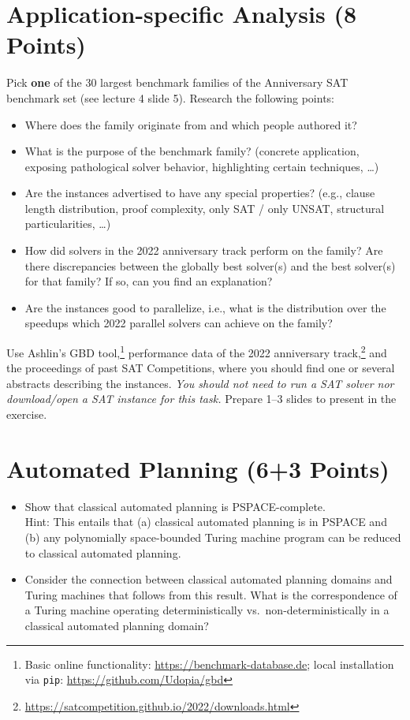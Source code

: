 \documentclass[a4paper]{article}
\begin{document}









\section{Application-specific Analysis (8 Points)}

Pick \textbf{one} of the 30 largest benchmark families of the Anniversary SAT benchmark set (see lecture 4 slide 5).
Research the following points:
\begin{itemize}
	\item Where does the family originate from and which people authored it?
	\item What is the purpose of the benchmark family? (concrete application, exposing pathological solver behavior, highlighting certain techniques, \ldots)
	\item Are the instances advertised to have any special properties? (e.g., clause length distribution, proof complexity, only SAT / only UNSAT, structural particularities, \ldots)
	\item How did solvers in the 2022 anniversary track perform on the family? Are there discrepancies between the globally best solver(s) and the best solver(s) for that family? If so, can you find an explanation?
	\item Are the instances good to parallelize, i.e., what is the distribution over the speedups which 2022 parallel solvers can achieve on the family?
\end{itemize}
Use Ashlin's GBD tool,\footnote{
	Basic online functionality: \url{https://benchmark-database.de}; local installation via \texttt{pip}: \url{https://github.com/Udopia/gbd}
} performance data of the 2022 anniversary track,\footnote{
	\url{https://satcompetition.github.io/2022/downloads.html}
} and the proceedings of past SAT Competitions, where you should find one or several abstracts describing the instances.
\textit{You should not need to run a SAT solver nor download/open a SAT instance for this task.}
Prepare 1--3 slides to present in the exercise.


\section{Automated Planning (6+3 Points)}

\begin{itemize}
	\item[(a)] Show that classical automated planning is PSPACE-complete.\\
	Hint: This entails that (a) classical automated planning is in PSPACE and (b) any polynomially space-bounded Turing machine program can be reduced to classical automated planning.
	\item[(b)] Consider the connection between classical automated planning domains and Turing machines that follows from this result.
	What is the correspondence of a Turing machine operating deterministically vs.~non-deterministically in a classical automated planning domain?
\end{itemize}
\end{document}
